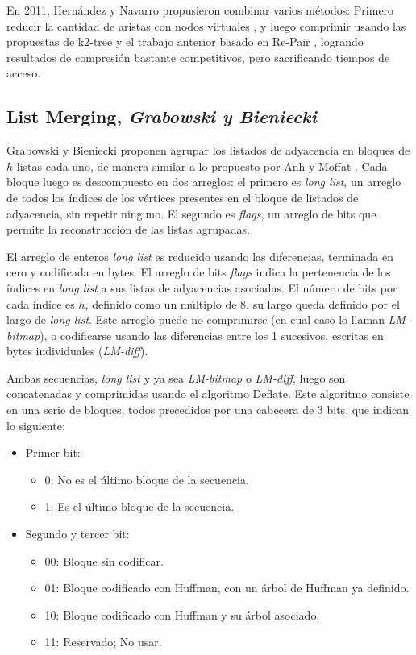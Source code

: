 En 2011, Hernández y Navarro \cite{hernandez2011compression} propusieron combinar varios métodos: Primero reducir la cantidad de aristas con nodos virtuales \cite{BuehrerChellapilla},  y luego comprimir usando las propuestas de k2-tree \cite{brisaboa2009k} y el trabajo anterior basado en Re-Pair \cite{claude2010fast}, logrando resultados de compresión bastante competitivos, pero sacrificando tiempos de acceso.


\subsection{List Merging, \textit{Grabowski y Bieniecki}}
Grabowski y Bieniecki proponen agrupar los listados de adyacencia en bloques de $h$ listas cada uno, de manera similar a lo propuesto por Anh y Moffat \cite{anh2010local}. Cada bloque luego es descompuesto en dos arreglos: el primero es \textit{long list}, un arreglo de todos los índices de los vértices presentes en el bloque de listados de adyacencia, sin repetir ninguno. El segundo es \textit{flags}, un arreglo de bits que permite la reconstrucción de las listas agrupadas. 

El arreglo de enteros \textit{long list} es reducido usando las diferencias, terminada en cero y codificada en bytes. El arreglo de bits \textit{flags} indica la pertenencia de los índices en \textit{long list} a sus listas de adyacencias asociadas. El número de bits por cada índice es $h$, definido como un múltiplo de 8. su largo queda definido por el largo de \textit{long list}. Este arreglo puede no comprimirse (en cual caso lo llaman \textit{LM-bitmap}), o codificarse usando las diferencias entre los 1 sucesivos, escritas en bytes individuales (\textit{LM-diff}).

Ambas secuencias, \textit{long list} y ya sea \textit{LM-bitmap} o \textit{LM-diff}, luego son concatenadas y comprimidas usando el algoritmo Deflate. Este algoritmo consiste en una serie de bloques, todos precedidos por una cabecera de 3 bits, que indican lo siguiente:

\begin{itemize}
	\item Primer bit:
	\begin{itemize}
		\item 0: No es el último bloque de la secuencia.
		\item 1: Es el último bloque de la secuencia.
	\end{itemize}
	\item Segundo y tercer bit:
	\begin{itemize}
		\item 00: Bloque sin codificar.
		\item 01: Bloque codificado con Huffman, con un árbol de Huffman ya definido.
		\item 10: Bloque codificado con Huffman y su árbol asociado.
		\item 11: Reservado; No usar.
	\end{itemize}
\end{itemize}

